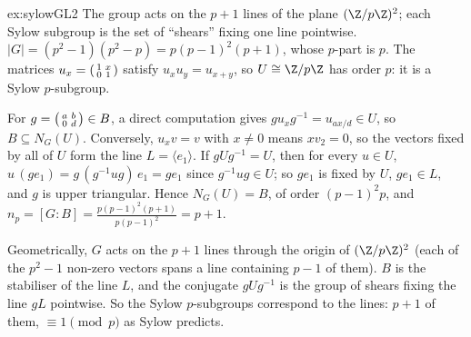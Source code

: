 \begin{solution}{ex:sylowGL2}
\idea The group acts on the $p+1$ lines of the plane $(\Z/p\Z)^2$; each Sylow subgroup is the set of ``shears'' fixing one line pointwise.
\writeup $|G|=(p^2-1)(p^2-p)=p(p-1)^2(p+1)$, whose $p$-part is $p$. The matrices $u_x=\begin{psmallmatrix}1&x\\0&1\end{psmallmatrix}$ satisfy $u_xu_y=u_{x+y}$, so $U\cong\Z/p\Z$ has order $p$: it is a Sylow $p$-subgroup.

For $g=\begin{psmallmatrix}a&b\\0&d\end{psmallmatrix}\in B$, a direct computation gives $gu_xg^{-1}=u_{ax/d}\in U$, so $B\subseteq N_G(U)$. Conversely, $u_xv=v$ with $x\ne0$ means $xv_2=0$, so the vectors fixed by all of $U$ form the line $L=\langle e_1\rangle$. If $gUg^{-1}=U$, then for every $u\in U$, $u\,(ge_1)=g\,(g^{-1}ug)\,e_1=ge_1$ since $g^{-1}ug\in U$; so $ge_1$ is fixed by $U$, $ge_1\in L$, and $g$ is upper triangular. Hence $N_G(U)=B$, of order $(p-1)^2p$, and $n_p=[G:B]=\frac{p(p-1)^2(p+1)}{p(p-1)^2}=p+1$.

Geometrically, $G$ acts on the $p+1$ lines through the origin of $(\Z/p\Z)^2$ (each of the $p^2-1$ non-zero vectors spans a line containing $p-1$ of them). $B$ is the stabiliser of the line $L$, and the conjugate $gUg^{-1}$ is the group of shears fixing the line $gL$ pointwise. So the Sylow $p$-subgroups correspond to the lines: $p+1$ of them, $\equiv1\pmod p$ as Sylow predicts.
\end{solution}

